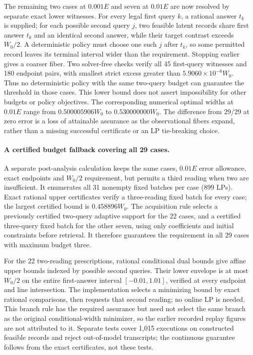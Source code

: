 The remaining two cases at $0.001E$ and seven at $0.01E$ are now resolved
by separate exact lower witnesses. For every legal first query $k$, a
rational answer $t_k$ is supplied; for each possible second query $j$, two
feasible latent records share first answer $t_k$ and an identical second
answer, while their target contrast exceeds $W_0/2$. A deterministic policy
must choose one such $j$ after $t_k$, so some permitted record leaves its
terminal interval wider than the requirement. Stopping earlier gives a
coarser fiber. Two solver-free checks verify all 45 first-query witnesses
and 180 endpoint pairs, with smallest strict excess greater than
$5.9060\times10^{-6}W_0$. Thus no deterministic policy with the same
two-query budget can guarantee the threshold in those cases. This lower
bound does not assert impossibility for other budgets or policy objectives.
The corresponding numerical optimal widths at $0.01E$ range from
$0.500005906W_0$ to $0.530000000W_0$. The difference from 29/29 at zero error
is a loss of attainable assurance as the observational fibers expand,
rather than a missing successful certificate or an LP tie-breaking choice.

\paragraph{A certified budget fallback covering all 29 cases.}
A separate post-analysis calculation keeps the same cases, $0.01E$ error
allowance, exact endpoints and $W_0/2$ requirement, but permits a third
reading when two are insufficient. It enumerates all 31 nonempty fixed
batches per case (899 LPs). Exact rational upper certificates verify a
three-reading fixed batch for every case; the largest certified bound is
$0.458896W_0$. The acquisition rule selects a previously certified
two-query adaptive support for the 22 cases, and a certified three-query
fixed batch for the other seven, using only coefficients and initial
constraints before retrieval. It therefore guarantees the requirement in
all 29 cases with maximum budget three.

For the 22 two-reading prescriptions, rational conditional dual bounds
give affine upper bounds indexed by possible second queries. Their lower
envelope is at most $W_0/2$ on the entire first-answer interval
$[-0.01,1.01]$, verified at every endpoint and line intersection. The
implementation selects a minimizing bound by exact rational comparisons,
then requests that second reading; no online LP is needed. This branch
rule has the required assurance but need not select the same branch as
the original conditional-width minimizer, so the earlier recorded replay
figures are not attributed to it. Separate tests cover 1,015 executions on
constructed feasible records and reject out-of-model transcripts; the
continuous guarantee follows from the exact certificates, not these tests.

